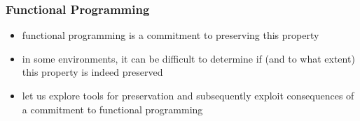 \begin{frame}
\frametitle{Functional Programming}

\begin{itemize}
  \item<1> functional programming is a commitment to preserving this property
  \item<2> in some environments, it can be difficult to determine if (and to what extent) this property is indeed preserved
  \item<3> let us explore tools for preservation and subsequently exploit consequences of a commitment to functional programming
\end{itemize}
\end{frame}
